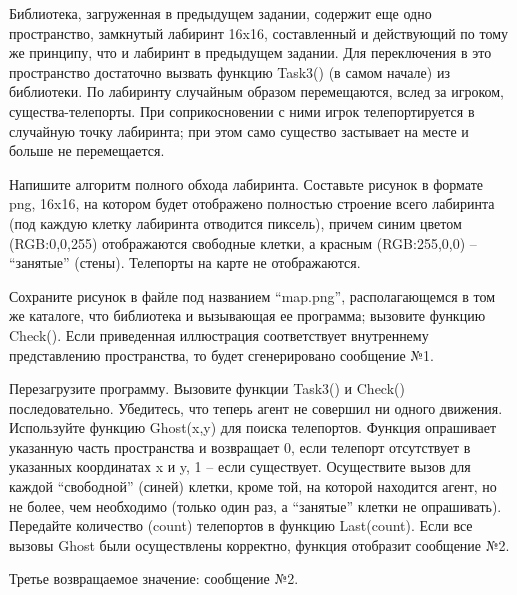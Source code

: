 
Библиотека, загруженная в предыдущем задании, содержит еще одно пространство, замкнутый лабиринт 16x16, составленный и действующий по тому же принципу, что и лабиринт в предыдущем задании. Для переключения в это пространство достаточно вызвать функцию Task3() (в самом начале) из библиотеки. По лабиринту случайным образом перемещаются, вслед за игроком, существа-телепорты. При соприкосновении с ними игрок телепортируется в случайную точку лабиринта; при этом само существо застывает на месте и больше не перемещается.

Напишите алгоритм полного обхода лабиринта. Составьте рисунок в формате png, 16x16, на котором будет отображено полностью строение всего лабиринта (под каждую клетку лабиринта отводится пиксель), причем синим цветом (RGB:0,0,255) отображаются свободные клетки, а красным (RGB:255,0,0) – “занятые” (стены). Телепорты на карте не отображаются.

Сохраните рисунок в файле под названием “map.png”, располагающемся в том же каталоге, что библиотека и вызывающая ее программа; вызовите функцию Check(). Если приведенная иллюстрация соответствует внутреннему представлению пространства, то будет сгенерировано сообщение №1.

Перезагрузите программу. Вызовите функции Task3() и Check() последовательно. Убедитесь, что теперь агент не совершил ни одного движения. Используйте функцию Ghost(x,y) для поиска телепортов. Функция опрашивает указанную часть пространства и возвращает 0, если телепорт отсутствует в указанных координатах x и y, 1 – если существует. Осуществите вызов для каждой “свободной” (синей) клетки, кроме той, на которой находится агент, но не более, чем необходимо (только один раз, а “занятые” клетки не опрашивать). Передайте количество (count) телепортов в функцию Last(count). Если все вызовы Ghost были осуществлены корректно, функция отобразит сообщение №2.

Третье возвращаемое значение: сообщение №2.

